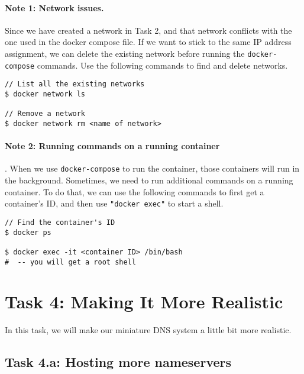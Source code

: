 \paragraph{Note 1: Network issues.}
Since we have created a network in Task 2, and that network
conflicts with the one used in the docker compose file. If we want to 
stick to the same IP address assignment, we can delete the existing 
network before running the \texttt{docker-compose} commands. 
Use the following commands to find and delete networks. 


\begin{lstlisting}
// List all the existing networks 
$ docker network ls 

// Remove a network
$ docker network rm <name of network>
\end{lstlisting}
 

\paragraph{Note 2: Running commands on a running container}.
When we use \texttt{docker-compose} to run the container, those 
containers will run in the background. 
Sometimes, we need to run additional commands on a running container.
To do that, we can use the following commands to first 
get a container's ID, and then use \texttt{"docker exec"} 
to start a shell. 


\begin{lstlisting}
// Find the container's ID 
$ docker ps 

$ docker exec -it <container ID> /bin/bash
#  -- you will get a root shell 
\end{lstlisting}
 



\section{Task 4: Making It More Realistic}


In this task, we will make our miniature DNS system
a little bit more realistic. 

\subsection{Task 4.a: Hosting more nameservers}


